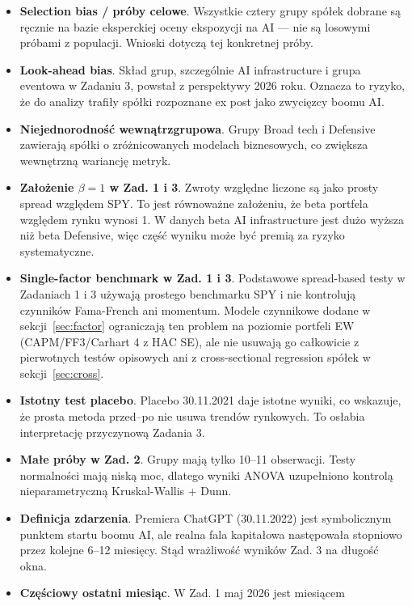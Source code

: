\documentclass[11pt,a4paper]{article}
\begin{document}
\begin{itemize}
  \item \textbf{Selection bias / próby celowe}. Wszystkie cztery grupy spółek
        dobrane są ręcznie na bazie eksperckiej oceny ekspozycji na AI --- nie
        są losowymi próbami z populacji. Wnioski dotyczą tej konkretnej próby.
  \item \textbf{Look-ahead bias}. Skład grup, szczególnie AI infrastructure
        i grupa eventowa w Zadaniu 3, powstał z perspektywy 2026 roku. Oznacza
        to ryzyko, że do analizy trafiły spółki rozpoznane ex post jako
        zwycięzcy boomu AI.
  \item \textbf{Niejednorodność wewnątrzgrupowa}. Grupy Broad tech i Defensive
        zawierają spółki o zróżnicowanych modelach biznesowych, co zwiększa
        wewnętrzną wariancję metryk.
  \item \textbf{Założenie $\beta=1$ w Zad. 1 i 3}. Zwroty względne liczone są
        jako prosty spread względem SPY. To jest równoważne założeniu, że beta
        portfela względem rynku wynosi 1. W danych beta AI infrastructure jest
        dużo wyższa niż beta Defensive, więc część wyniku może być premią za
        ryzyko systematyczne.
  \item \textbf{Single-factor benchmark w Zad. 1 i 3}. Podstawowe spread-based
        testy w Zadaniach 1 i 3 używają prostego benchmarku SPY i nie kontrolują
        czynników Fama-French ani momentum. Modele czynnikowe dodane w
        sekcji~\ref{sec:factor} ograniczają ten problem na poziomie portfeli EW
        (CAPM/FF3/Carhart 4 z HAC SE), ale nie usuwają go całkowicie z pierwotnych
        testów opisowych ani z cross-sectional regression spółek
        w sekcji~\ref{sec:cross}.
  \item \textbf{Istotny test placebo}. Placebo 30.11.2021 daje istotne wyniki,
        co wskazuje, że prosta metoda przed--po nie usuwa trendów rynkowych.
        To osłabia interpretację przyczynową Zadania 3.
  \item \textbf{Małe próby w Zad. 2}. Grupy mają tylko 10--11 obserwacji.
        Testy normalności mają niską moc, dlatego wyniki ANOVA uzupełniono
        kontrolą nieparametryczną Kruskal-Wallis + Dunn.
  \item \textbf{Definicja zdarzenia}. Premiera ChatGPT (30.11.2022) jest
        symbolicznym punktem startu boomu AI, ale realna fala kapitałowa
        następowała stopniowo przez kolejne 6--12 miesięcy. Stąd wrażliwość
        wyników Zad. 3 na długość okna.
  \item \textbf{Częściowy ostatni miesiąc}. W Zad. 1 maj 2026 jest miesiącem

\end{itemize}
\end{document}
